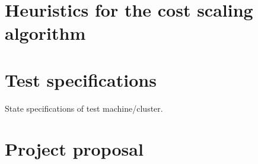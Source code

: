 \documentclass[12pt,a4paper,twoside,notitlepage]{report}
\theoremstyle{plain}
\theoremstyle{definition}
\theoremstyle{remark}
\begin{document}
\setcounter{page}{1}
\pagestyle{headings}



\cleardoublepage


\cleardoublepage


\cleardoublepage


\cleardoublepage


\cleardoublepage

\printbibliography[heading=bibintoc,category=cited]

\printbibliography[title={WARNING: Uncited},notcategory=cited]


\appendix
\chapter{Heuristics for the cost scaling algorithm} \label{appendix:csheuristics}
 

\chapter{Test specifications}
State specifications of test machine/cluster.

\chapter{Project proposal} \label{appendix:proposal}

\end{document}
